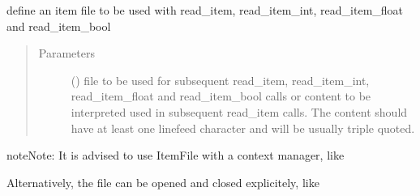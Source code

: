 \documentclass[letterpaper,10pt,english]{sphinxmanual}
\begin{document}
\begin{fulllineitems}
\label{\detokenize{Reference:salabim.ItemFile}}
define an item file to be used with read\_item, read\_item\_int, read\_item\_float and read\_item\_bool
\begin{quote}\begin{description}
\item[{Parameters}] \leavevmode
{} () \textendash{} file to be used for subsequent read\_item, read\_item\_int, read\_item\_float and read\_item\_bool calls 
or 
content to be interpreted used in subsequent read\_item calls. The content should have at least one linefeed
character and will be usually  triple quoted.

\end{description}\end{quote}

\begin{sphinxadmonition}{note}{Note:}
It is advised to use ItemFile with a context manager, like

%
\begin{sphinxVerbatim}[commandchars=\\\{\}]
   
       
       
\end{sphinxVerbatim}

Alternatively, the file can be opened and closed explicitely, like

%
\begin{sphinxVerbatim}[commandchars=\\\{\}]
  
  
  
\end{sphinxVerbatim}


\end{sphinxadmonition}
\end{fulllineitems}
\end{document}
